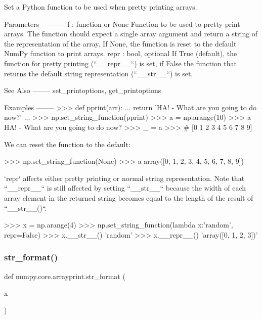 \begin{DoxyVerb}Set a Python function to be used when pretty printing arrays.

Parameters
----------
f : function or None
    Function to be used to pretty print arrays. The function should expect
    a single array argument and return a string of the representation of
    the array. If None, the function is reset to the default NumPy function
    to print arrays.
repr : bool, optional
    If True (default), the function for pretty printing (``__repr__``)
    is set, if False the function that returns the default string
    representation (``__str__``) is set.

See Also
--------
set_printoptions, get_printoptions

Examples
--------
>>> def pprint(arr):
...     return 'HA! - What are you going to do now?'
...
>>> np.set_string_function(pprint)
>>> a = np.arange(10)
>>> a
HA! - What are you going to do now?
>>> _ = a
>>> # [0 1 2 3 4 5 6 7 8 9]

We can reset the function to the default:

>>> np.set_string_function(None)
>>> a
array([0, 1, 2, 3, 4, 5, 6, 7, 8, 9])

`repr` affects either pretty printing or normal string representation.
Note that ``__repr__`` is still affected by setting ``__str__``
because the width of each array element in the returned string becomes
equal to the length of the result of ``__str__()``.

>>> x = np.arange(4)
>>> np.set_string_function(lambda x:'random', repr=False)
>>> x.__str__()
'random'
>>> x.__repr__()
'array([0, 1, 2, 3])'\end{DoxyVerb}
 \mbox{\label{namespacenumpy_1_1core_1_1arrayprint_a9c25606ff694dc48b0e45ebef848025a}} 
\subsubsection{\texorpdfstring{str\+\_\+format()}{str\_format()}}
{\footnotesize\ttfamily def numpy.\+core.\+arrayprint.\+str\+\_\+format (\begin{DoxyParamCaption}\item[{}]{x }\end{DoxyParamCaption})}



